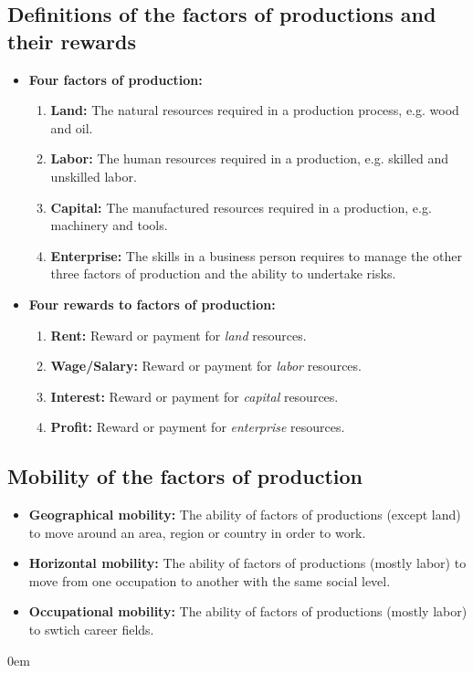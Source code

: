 \documentclass[11pt, a4paper, openany]{book}
\begin{document}
\subsection{Definitions of the factors of productions and their rewards}

\begin{itemize}\itemsep0em
    \item \textbf{Four factors of production:}
        \begin{enumerate}\itemsep0em
            \item \textbf{Land:} The natural resources required in a production process, e.g. wood and oil.
            \item \textbf{Labor:} The human resources required in a production, e.g. skilled and unskilled labor.
            \item \textbf{Capital:} The manufactured resources required in a production, e.g. machinery and tools.
            \item \textbf{Enterprise:} The skills in a business person requires to manage the other three factors of production and the ability to undertake risks.
        \end{enumerate}
    \item \textbf{Four rewards to factors of production:}
        \begin{enumerate}\itemsep0em
            \item \textbf{Rent:} Reward or payment for \textit{land} resources.
            \item \textbf{Wage/Salary:} Reward or payment for \textit{labor} resources.
            \item \textbf{Interest:} Reward or payment for \textit{capital} resources.
            \item \textbf{Profit:} Reward or payment for \textit{enterprise} resources.
        \end{enumerate}
\end{itemize}

\subsection{Mobility of the factors of production}

\begin{itemize}\itemsep0em
    \item \textbf{Geographical mobility:} The ability of factors of productions (except land) to move around an area, region or country in order to work.
    \item \textbf{Horizontal mobility:} The ability of factors of productions (mostly labor) to move from one occupation to another with the same social level.
    \item \textbf{Occupational mobility:} The ability of factors of productions (mostly labor) to swtich career fields.
\end{itemize}\itemsep0em
\end{document}
